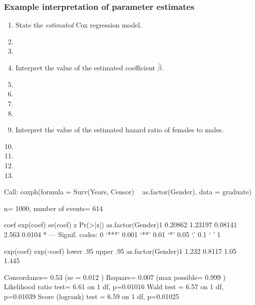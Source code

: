 \begin{frame}
\frametitle{Example interpretation of parameter estimates}
\begin{enumerate}
\item State the \emph{estimated} Cox regression model.
\item[]
\item[]
\item Interpret the value of the estimated coefficient $\hat{\beta}$.
\item[]
\item[]
\item[]
\item[]
\item Interpret the value of the estimated hazard ratio of females to males.
\item[]
\item[]
\item[]
\item[]
\end{enumerate}
\end{frame}

\begin{frame}[fragile]
\begin{Rout}{-.05}
Call:
coxph(formula = Surv(Years, Censor) ~ as.factor(Gender), data = graduate)

  n= 1000, number of events= 614

                      coef exp(coef) se(coef)     z Pr(>|z|)
as.factor(Gender)1 0.20862   1.23197  0.08141 2.563   0.0104 *
---
Signif. codes:  0 ‘***’ 0.001 ‘**’ 0.01 ‘*’ 0.05 ‘.’ 0.1 ‘ ’ 1

                   exp(coef) exp(-coef) lower .95 upper .95
as.factor(Gender)1     1.232     0.8117      1.05     1.445

Concordance= 0.53  (se = 0.012 )
Rsquare= 0.007   (max possible= 0.999 )
Likelihood ratio test= 6.61  on 1 df,   p=0.01016
Wald test            = 6.57  on 1 df,   p=0.01039
Score (logrank) test = 6.59  on 1 df,   p=0.01025
\end{Rout}
\end{frame}


 